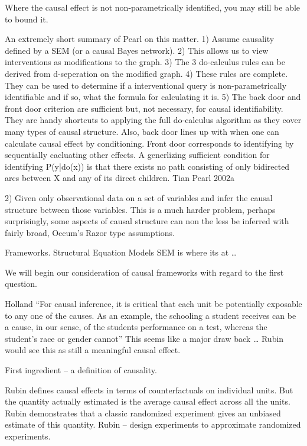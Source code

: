 \documentclass[11pt,a4paper]{article}
\begin{document}
Where the causal effect is not non-parametrically identified, you may still be able to bound it. 


An extremely short summary of Pearl on this matter. 1) Assume causality defined by a SEM (or a causal Bayes network). 2) This allows us to view interventions as modifications to the graph. 3) The 3 do-calculus rules can be derived from d-seperation on the modified graph. 4) These rules are complete. They can be used to determine if a interventional query is non-parametrically identifiable and if so, what the formula for calculating it is. 5) The back door and front door criterion are sufficient but, not necessary, for causal identifiability. They are handy shortcuts to applying the full do-calculus algorithm as they cover many types of causal structure. Also, back door lines up with when one can calculate causal effect by conditioning. Front door corresponds to identifying by sequentially cacluating other effects. A generlizing sufficient condition for identifying P(y|do(x)) is that there exists no path consisting of only bidirected arcs between X and any of its direct children. Tian  Pearl 2002a 



2) Given only observational data on a set of variables and infer the causal structure between those variables. This is a much harder problem, perhaps surprisingly, some aspects of causal structure can non the less be inferred with fairly broad, Occum's Razor type assumptions. 

Frameworks. Structural Equation Models SEM is where its at …

We will begin our consideration of causal frameworks with regard to the first question. 

Holland “For causal inference, it is critical that each unit be potentially exposable to any one of the causes. As an example, the schooling a student receives can be a cause, in our sense, of the students performance on a test, whereas the student's race or gender cannot” This seems like a major draw back … Rubin would see this as still a meaningful causal effect. 

First ingredient – a definition of causality. 

Rubin defines causal effects in terms of counterfactuals on individual units. But the quantity actually estimated is the average causal effect across all the units. Rubin demonstrates that a classic randomized experiment gives an unbiased estimate of this quantity. Rubin – design experiments to approximate randomized experiments.
\end{document}
